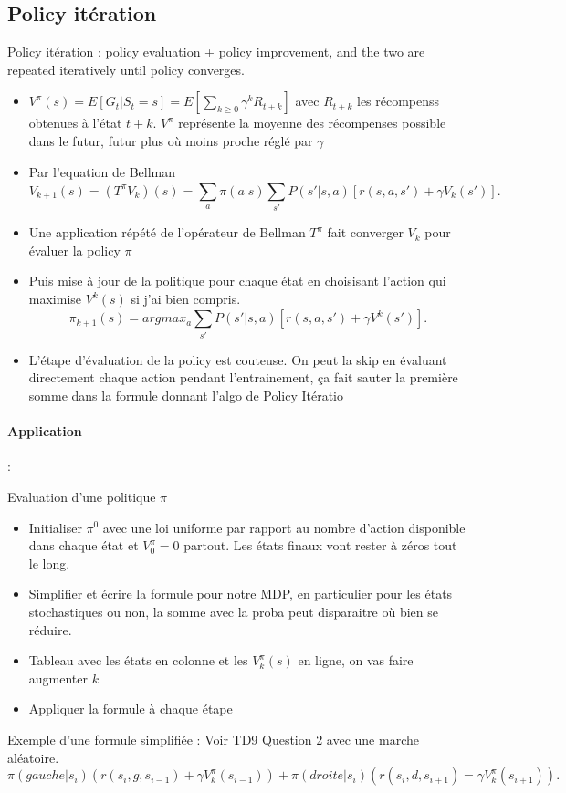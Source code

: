 \documentclass{article}
\theoremstyle{plain}%
\theoremstyle{definition}
\theoremstyle{remark}
\begin{document}
\subsection{Policy itération}
Policy itération : policy evaluation + policy improvement, and the two are repeated iteratively until policy converges.
\begin{itemize}
    \item $ V^\pi (s) = E[G_t | S_t = s] = E[ \sum_{k \geq 0}^{} \gamma ^k R_{t+k}] $ avec $ R_{t+k} $ les récompenss obtenues à l'état $ t+k $. $ V^\pi $ représente la moyenne des récompenses possible dans le futur, futur plus où moins proche réglé par $ \gamma  $ 
    \item Par l'equation de Bellman
    \[
        V_{k+1}(s) = (T^\pi V_k)(s) = \sum_{a}^{}\pi (a | s) \sum_{s'}^{}P(s' | s, a) [r(s, a, s') + \gamma V_k(s')]
    .\]
    \item Une application répété de l'opérateur de Bellman $ T^\pi  $ fait converger $ V_k $ pour évaluer la policy $ \pi  $ 
    \item Puis mise à jour de la politique pour chaque état en choisisant l'action qui maximise $ V^k(s) $ si j'ai bien compris. 
    \[
        \pi _{k+1}(s) = argmax_a \sum_{s'}^{} P(s' | s, a) [ r(s, a, s') + \gamma V^{k}(s')]
    .\]
    \item L'étape d'évaluation de la policy est couteuse. On peut la skip en évaluant directement chaque action pendant l'entrainement, ça fait sauter la première somme dans la formule donnant l'algo de Policy Itératio
\end{itemize}


\paragraph*{Application} : 

Evaluation d'une politique $ \pi $ 
\begin{itemize}
    \item Initialiser $ \pi ^0 $ avec une loi uniforme par rapport au nombre d'action disponible dans chaque état et $ V^\pi _0 = 0 $ partout. Les états finaux vont rester à zéros tout le long.
    \item Simplifier et écrire la formule pour notre MDP, en particulier pour les états stochastiques ou non, la somme avec la proba peut disparaitre où bien se réduire.
    \item Tableau avec les états en colonne et les $ V^\pi_k (s) $ en ligne, on vas faire augmenter $ k $ 
    \item Appliquer la formule à chaque étape
\end{itemize}
Exemple d'une formule simplifiée : Voir TD9 Question 2 avec une marche aléatoire. 
\[
    \pi (gauche | s_i) (r(s_i, g, s_{i-1}) + \gamma V_k^\pi (s_{i-1})) + \pi (droite | s_i) (r(s_i, d, s_{i+1}) = \gamma V_k^\pi (s_{i+1}))
.\]
\end{document}
